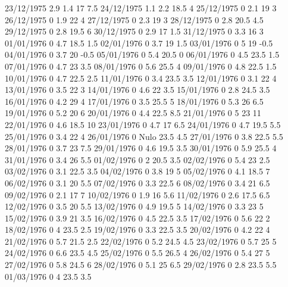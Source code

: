 23/12/1975  2.9    1.4    17     7.5 
24/12/1975  1.1    2.2    18.5   4 
25/12/1975  0      2.1    19     3 
26/12/1975  0      1.9    22     4 
27/12/1975  0      2.3    19     3 
28/12/1975  0      2.8    20.5   4.5 
29/12/1975  0      2.8    19.5   6 
30/12/1975  0      2.9    17     1.5 
31/12/1975  0      3.3    16     3 
01/01/1976  0      4.7    18.5   1.5 
02/01/1976  0      3.7    19     1.5 
03/01/1976  0      5      19    -0.5 
04/01/1976  0      3.7    20    -0.5 
05/01/1976  0      5.4    20.5   0 
06/01/1976  0      4.5    23.5   1.5 
07/01/1976  0      4.7    23     3.5 
08/01/1976  0      5.6    25.5   4 
09/01/1976  0      4.8    22.5   1.5 
10/01/1976  0      4.7    22.5   2.5 
11/01/1976  0      3.4    23.5   3.5 
12/01/1976  0      3.1    22     4 
13/01/1976  0      3.5    22     3 
14/01/1976  0      4.6    22     3.5 
15/01/1976  0      2.8    24.5   3.5 
16/01/1976  0      4.2    29     4 
17/01/1976  0      3.5    25.5   5 
18/01/1976  0      5.3    26     6.5 
19/01/1976  0      5.2    20     6 
20/01/1976  0      4.4    22.5   8.5 
21/01/1976  0      5      23     11 
22/01/1976  0      4.6    18.5   10 
23/01/1976  0      4.7    17     6.5 
24/01/1976  0      4.7    19.5   5.5 
25/01/1976  0      3.4    22     4 
26/01/1976  0     Nulo    23.5   4.5 
27/01/1976  0      3.8    22.5   5.5 
28/01/1976  0      3.7    23     7.5 
29/01/1976  0      4.6    19.5   3.5 
30/01/1976  0      5.9    25.5   4 
31/01/1976  0      3.4    26     5.5 
01/02/1976  0      2      20.5   3.5 
02/02/1976  0      5.4    23     2.5 
03/02/1976  0      3.1    22.5   3.5 
04/02/1976  0      3.8    19     5 
05/02/1976  0      4.1    18.5   7 
06/02/1976  0      3.1    20     5.5 
07/02/1976  0      3.3    22.5   6 
08/02/1976  0      3.4    21     6.5 
09/02/1976  0      2.1    17     7 
10/02/1976  0      1.9    16     5.6 
11/02/1976  0      2.6    17.5   6.5 
12/02/1976  0      3.5    20     5.5 
13/02/1976  0      4.9    19.5   5 
14/02/1976  0      3.3    23     5 
15/02/1976  0      3.9    21     3.5 
16/02/1976  0      4.5    22.5   3.5 
17/02/1976  0      5.6    22     2 
18/02/1976  0      4      23.5   2.5 
19/02/1976  0      3.3    22.5   3.5 
20/02/1976  0      4.2    22     4 
21/02/1976  0      5.7    21.5   2.5 
22/02/1976  0      5.2    24.5   4.5 
23/02/1976  0      5.7    25     5 
24/02/1976  0      6.6    23.5   4.5 
25/02/1976  0      5.5    26.5   4 
26/02/1976  0      5.4    27     5 
27/02/1976  0      5.8    24.5   6 
28/02/1976  0      5.1    25     6.5 
29/02/1976  0      2.8    23.5   5.5 
01/03/1976  0      4      23.5   3.5 
